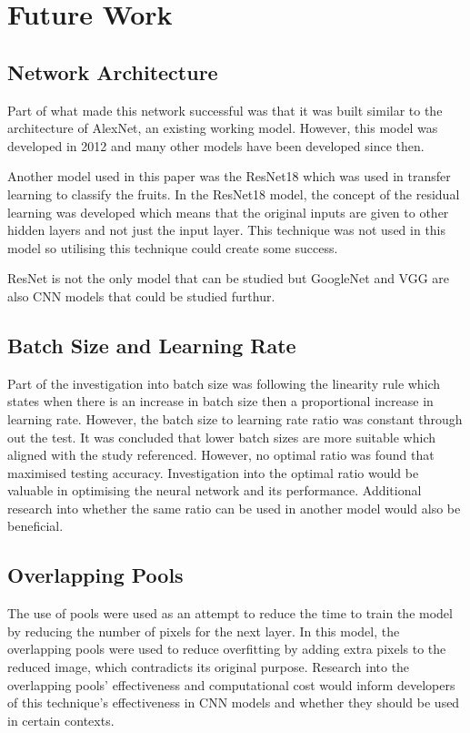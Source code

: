 \documentclass[../main.tex]{subfiles}
\begin{document}
\section{Future Work}


\subsection{Network Architecture}

Part of what made this network successful was that it was built similar to the architecture of AlexNet, an existing working model. However, this model was developed in 2012 and many other models have been developed since then. 

Another model used in this paper was the ResNet18 which was used in transfer learning to classify the fruits. In the ResNet18 model, the concept of the residual learning was developed which means that the original inputs are given to other hidden layers and not just the input layer.  \cite{DBLP:journals/corr/HeZRS15} This technique was not used in this model so utilising this technique could create some success. 

ResNet is not the only model that can be studied but GoogleNet and VGG are also CNN models that could be studied furthur. 

\subsection{Batch Size and Learning Rate}

Part of the investigation into batch size was following the linearity rule which states when there is an increase in batch size then a proportional increase in learning rate. However, the batch size to learning rate ratio was constant through out the test. It was concluded that lower batch sizes are more suitable which aligned with the study referenced. However, no optimal ratio was found that maximised testing accuracy. Investigation into the optimal ratio would be valuable in optimising the neural network and its performance. Additional research into whether the same ratio can be used in another model would also be beneficial. 

\subsection{Overlapping Pools}

The use of pools were used as an attempt to reduce the time to train the model by reducing the number of pixels for the next layer. In this model, the overlapping pools were used to reduce overfitting by adding extra pixels to the reduced image, which contradicts its original purpose. Research into the overlapping pools' effectiveness and computational cost would inform developers of this technique's effectiveness in CNN models and whether they should be used in certain contexts. 
\end{document}
